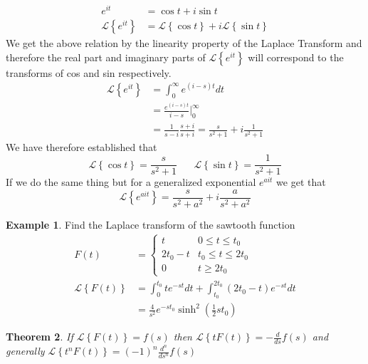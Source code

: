 \documentclass{report}
\newtheorem{theorem}{Theorem}[chapter]
\theoremstyle{definition}
\newtheorem{example}[theorem]{Example}
\theoremstyle{remark}
\newcommand{\lapt}[1]{\mathscr{L}\left\{ #1\right\}}
\newcommand{\twen}{\hspace{20pt}}
\newcommand{\od}[2]{\frac{d #1}{d#2}}
\begin{document}
\begin{equation*}
\begin{split}
    e^{it} &= \cos t+i\sin t \\
    \lapt{e^{it}} &= \lapt{\cos t} + i\lapt{\sin t}
\end{split}
\end{equation*}
We get the above relation by the linearity property of the Laplace Transform and therefore the real part and imaginary parts of $\lapt{e^{it}}$ will correspond to the transforms of cos and sin respectively.
\begin{equation*}
    \begin{split}
        \lapt{e^{it}} &=\int^\infty_0 e^{(i-s)t}dt \\
        &=\frac{e^{(i-s)t}}{i-s} \Bigg|^\infty_0 \\
        &=\frac{1}{s-i} \frac{s+i}{s+i} = \frac{s}{s^2+1} + i\frac{1}{s^2+1}
    \end{split}
\end{equation*}
We have therefore established that 
\begin{equation*}
    \lapt{\cos t} = \frac{s}{s^2+1} \twen \lapt{\sin t} = \frac{1}{s^2+1}
\end{equation*}
If we do the same thing but for a generalized exponential $e^{ait}$ we get that 
\begin{equation*}
    \lapt{e^{ait}} = \frac{s}{s^2+a^2} +i\frac{a}{s^2+a^2}
\end{equation*}
\begin{example}
    Find the Laplace transform of the sawtooth function 
    \begin{equation*}
    \begin{split}
        F(t) &= \begin{cases}
            t & 0\leq t \leq t_0 \\
            2t_0-t & t_0 \leq t \leq 2t_0 \\
            0 & t \geq 2t_0
        \end{cases}
        \\ \lapt{F(t)} &= \int^{t_0}_0te^{-st}dt + \int^{2t_0}_{t_0} (2t_0-t)e^{-st}dt \\
        &=\frac{4}{s^2}e^{-st_0}\sinh ^2\left(\tfrac{1}{2} st_0\right)
        \end{split}
    \end{equation*}
\end{example}
\begin{theorem}
    If $\lapt{F(t)} = f(s)$ then $\lapt{tF(t)} = -\od{}{s}f(s)$ and generally $\lapt{t^nF(t)} = (-1)^n \frac{d^n}{ds^n} f(s)$ \label{theo:1.5}
\end{theorem}
\end{document}
